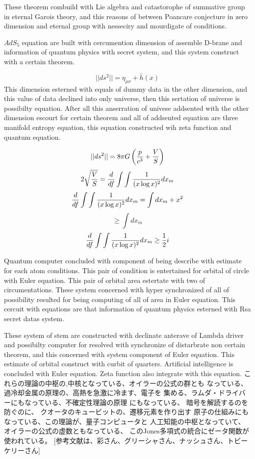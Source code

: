 \documentclass{jsarticle}
\begin{document}
{   These theorem combuild with Lie algebra and catastorophe  
   of summative group in eternal Garois theory,
   and this reasons of between Poancare conjecture in zero dimension 
   and eternal group with nesseciry and mourdigate of conditions.


   $ AdS_5 $ equation are built with cercumention dimension of assemble
   D-brane and information of quantum physics with secret system,
   and this system construct with a certain theorem.

   $$ ||ds^2|| = \eta_{\mu\nu} + \bar{h}(x) $$ 
   This dimension esterned with equals of dummy data in the other dimension,
   and this value of data declined into only universe,
   then this sertation of universe is possibilty equation.
   After all this anserration of univese addsented with the other dimension
   escourt for certain theorem and all of addsented equation
   are three manifold entropy equation,
   this equation constructed wih zeta function and quantum equation.

   $$ ||ds^2|| = 8 \pi G \left({p \over c^3} + {V \over S}\right) $$
   $$ 2 \sqrt{V \over S}= {d \over df}\int \int{1 \over (x \log x)^2}dx_m $$
   $$ {d \over df} \int \int{ 1 \over (x \log x)^2}dx_m = \int dx_m + x^2 $$
   $$ \ge \int dx_m $$
   $$ {d \over df} \int \int{1 \over (x \log x)^2}dx_m \ge {1 \over 2}i $$

     Quantum computer concluded with component of being describe with 
     estimate for each atom conditions. This pair of condition is
     entertained for orbital of circle with Euler equation.
     This pair of orbital area estertate with two of circumentations.
     These system concerned with hyper synchronized of all of possibility
     resulted for being computing of all of area in Euler equation.
     This cercuit with equations are that information of quantum physics
     esterned with Rsa secret datas system.


     These system of stem are constructed with declinate anterave of
     Lambda driver and possibilty computer for resolved with synchronize
     of distarbrate non certain theorem, and this concerned with
     system component of Euler equation.
     This estimate of orbital construct with curbit of quarters.
     Artificial intelligence is concluded with Euler equation.
     Zeta function also integrate with this equation.
     これらの理論の中枢の,中核となっている、オイラーの公式の群とも
     なっている、過冷却金属の原理の、高熱を急激に冷ます、電子を
     集める、ラムダ・ドライバーにもなっている、不確定性理論の原理
     にもなっている、 暗号を解読するのを防ぐのに、
     クオータのキュービットの、遷移元素を作り出す
     原子の仕組みにもなっている、この理論が、量子コンピュータと
     人工知能の中枢となっていて、オイラーの公式の虚数ともなっている、
     このJones多項式の統合にゼータ関数が使われている。
     [参考文献は、彩さん、グリーシャさん、ナッシュさん、トビーケリーさん]

}
\end{document}
